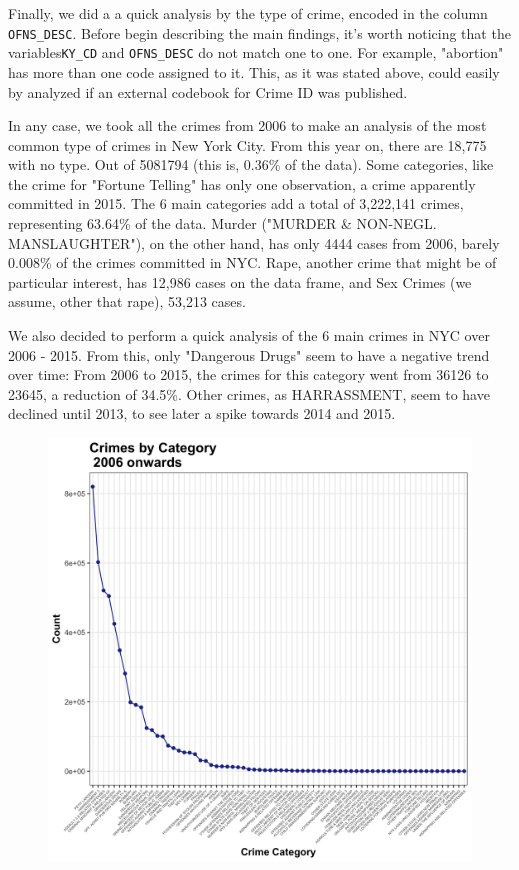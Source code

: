\documentclass{article}
\begin{document}
Finally, we did a  a quick analysis by the type of crime, encoded in the column \texttt{OFNS\_DESC}. Before begin describing the main findings, it's worth noticing that the variables\texttt{KY\_CD} and \texttt{OFNS\_DESC} do not match one to one. For example, "abortion" has more than one code assigned to it. This, as it was stated above, could easily by analyzed if an external codebook for Crime ID was published. 

In any case, we took all the crimes from 2006 to make an analysis of the most common type of crimes in New York City. From this year on, there are 18,775 with no type. Out of 5081794 (this is, 0.36\% of the data). Some categories, like the crime for "Fortune Telling" has only one observation, a crime apparently committed in 2015. The 6 main categories add a total of 3,222,141 crimes, representing  63.64\% of the data. Murder ("MURDER \& NON-NEGL. MANSLAUGHTER"), on the other hand, has only 4444 cases from 2006, barely 0.008\% of the crimes committed in NYC. Rape, another crime that might be of particular interest, has 12,986 cases on the data frame, and Sex Crimes (we assume, other that rape), 53,213 cases. 

We also decided to perform a quick analysis of the 6 main crimes in NYC over 2006 - 2015. From this, only "Dangerous Drugs" seem to have a negative trend over time: From 2006 to 2015, the crimes for this category went from 36126 to 23645, a reduction of 34.5\%. Other crimes, as HARRASSMENT, seem to have declined until 2013, to see later a spike towards 2014 and 2015. 


\begin{figure}[H]
\centering
\includegraphics[scale=0.16]{6_Type.png}
\end{figure}
\end{document}
